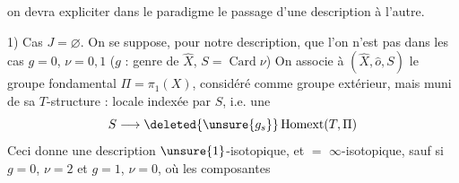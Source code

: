on devra expliciter dans le paradigme
le passage d'une description à
l'autre.

1) Cas $J=\varnothing$.
On se suppose, pour
notre description, que l'on n'est
pas dans les cas $g=0$, $\nu=0,1$
($g$ : genre de $\widehat X$, $S=\operatorname{Card}\nu$)
On associe à $(\widehat X,\widehat o,S)$ le
groupe fondamental $\Pi=\pi_1(X)$, considéré
comme groupe extérieur, mais
muni de sa $T$-structure :
locale indexée par $S$, i.e. une
\[S\longrightarrow\deleted{\unsure{g_s}}\operatorname{Homext}(T,\Pi)\]
Ceci donne \inserted{$=$} une description
$\unsure{1}$-isotopique, et $=$ $\infty$-isotopique,
sauf si $g=0$, $\nu=2$ et $g=1$, $\nu=0$,
où les composantes 
